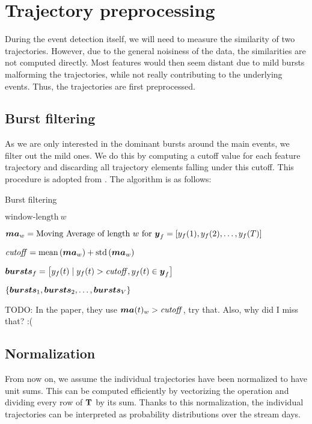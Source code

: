 \section{Trajectory preprocessing}
During the event detection itself, we will need to measure the similarity of two trajectories. However, due to the general noisiness of the data, the similarities are not computed directly. Most features would then seem distant due to mild bursts malforming the trajectories, while not really contributing to the underlying events. Thus, the trajectories are first preprocessed.

\subsection{Burst filtering}
As we are only interested in the dominant bursts around the main events, we filter out the mild ones. We do this by computing a cutoff value for each feature trajectory and discarding all trajectory elements falling under this cutoff. This procedure is adopted from \cite{online-search-queries}. The algorithm is as follows:

\begin{algorithm}[H]
\begin{algorithmic}[1]
\caption{Burst filtering}
\Input $\text{window-length} ~ w$

	\State $\vect{MA}_{w} = \text{Moving Average of length} ~ w ~ \text{for} ~ \vect{\traj}_{f} = \left[ \traj_{f}(1), \traj_{f}(2), \dots, \traj_{f}(\streamlen) \right]$

	\State $\mathit{cutoff} = \text{mean} \left( \vect{MA}_{w} \right) + \text{std} \left( \vect{MA}_{w} \right)$

	\State $\vect{bursts}_{f} = \left[ \traj_{f}(t) \mid \traj_{f}(t) > \mathit{cutoff}, \traj_{f}(t) \in \vect{y}_{f} \right]$
\EndFor

\Output $\{ \vect{bursts}_{1}, \vect{bursts}_{2}, \dots, \vect{bursts}_{\featcount} \}$
\end{algorithmic}
\end{algorithm}

{\color{red} TODO: In the paper, they use $\vect{MA}(t)_{w} > \mathit{cutoff}$, try that. Also, why did I miss that? :(}

\subsection{Normalization}
From now on, we assume the individual trajectories have been normalized to have unit sums. This can be computed efficiently by vectorizing the operation and dividing every row of $\mathbf{T}$ by its sum. Thanks to this normalization, the individual trajectories can be interpreted as probability distributions over the stream days.

